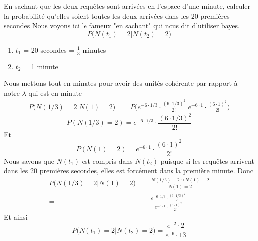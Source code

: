 \begin{exo}
\begin{subexo}{En sachant que les deux requêtes sont arrivées en l'espace d'une minute, calculer
      la probabilité qu'elles soient toutes les deux arrivées dans les 20 premières secondes}
    Nous voyons ici le fameux "en sachant" qui nous dit d'utiliser bayes.
    \[
      P\biggl( N(t_1) = 2 \biggl| N(t_2) = 2\biggr)
    \]
    \begin{enumerate}
      \item $t_1$ = 20 secondes = $\frac{1}{3}$ minutes
      \item $t_2$ = 1 minute
    \end{enumerate}
    Nous mettons tout en minutes pour avoir des unités cohérente par rapport à notre $\lambda$ qui est en minute
    \begin{align*}
      P\biggl( N(1/3) = 2 \biggl| N(1) = 2\biggr)
      = & P\biggl( e^{-6 \cdot 1/3} \cdot \frac{(6 \cdot 1/3)^2}{2 !} \biggl|
      e^{-6 \cdot 1} \cdot \frac{(6 \cdot 1)^2}{2 !}  \biggr)
    \end{align*}
    $$P(N(1/3) = 2) = e^{-6 \cdot 1/3} \cdot \frac{(6 \cdot 1/3)^2}{2 !}$$
    Et
    $$
      P(N(1) = 2) = e^{-6 \cdot 1} \cdot \frac{(6 \cdot 1)^2}{2 !}
    $$
    Nous savons que $N(t_1)$ est compris dans $N(t_2)$ puisque si les requêtes arrivent dans les 20 premières secondes, elles est forcément dans la première minute.
    Donc
    \begin{align*}
      P\biggl( N(1/3) = 2 \biggl| N(1) = 2\biggr) = & \frac{N(1/3) = 2 \cap N(1) = 2 }{N(1) = 2}                                                                   \\
      =                                             & \frac{ e^{-6 \cdot 1/3} \cdot \frac{(6 \cdot 1/3)^2}{2 !}}{ e^{-6 \cdot 1} \cdot \frac{(6 \cdot 1)^2}{2 !} }
    \end{align*}
    Et ainsi
    \[
      P\biggl( N(t_1) = 2 \biggl| N(t_2) = 2\biggr) = \frac{e^{-2}\cdot 2}{e^{-6}\cdot 13}
    \]


  \end{subexo}
\end{exo}
